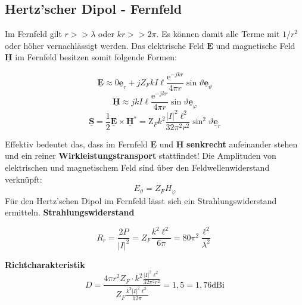 \documentclass[english]{latex4ei/latex4ei_sheet}
\renewcommand{\vec}[1]{\underline{\boldsymbol{#1}}}
\begin{document}
\begin{sectionbox}
\subsection{Hertz'scher Dipol - Fernfeld}
Im Fernfeld gilt $r >> \lambda$ oder $kr >> 2\pi$. Es können damit alle Terme mit $1/r^2$ oder höher vernachlässigt werden. Das elektrische Feld $\vec{E}$ und magnetische Feld $\vec{H}$ im Fernfeld besitzen somit folgende Formen:
\begin{emphbox}
$$
\vec{E} \approx 0 \vec{e}_{r}+j Z_{F} k I \ell \frac{\mathrm{e}^{-j k r}}{4 \pi r} \sin \vartheta \vec{e}_{\vartheta}
$$
$$
\vec{H} \approx j k I \ell \frac{\mathrm{e}^{-j k r}}{4 \pi r} \sin \vartheta \vec{e}_{\varphi}
$$
$$
\vec{S}=\frac{1}{2} \vec{E} \times \vec{H}^{*}=\mathrm{Z}_{F} k^{2} \frac{|I|^{2} \ell^{2}}{32 \pi^{2} r^{2}} \sin ^{2} \vartheta \vec{e}_{r}
$$
\end{emphbox}
Effektiv bedeutet das, dass im Fernfeld $\vec{E}$ und $\vec{H}$ \textbf{senkrecht} aufeinander stehen und ein reiner \textbf{Wirkleistungstransport} stattfindet!
Die Amplituden von elektrischen und magnetischem Feld sind über den Feldwellenwiderstand verknüpft:
$$
E_{\vartheta}=Z_{F} H_{\varphi}
$$
Für den Hertz'schen Dipol im Fernfeld lässt sich ein Strahlungswiderstand ermitteln.
\textbf{Strahlungswiderstand}
\begin{emphbox}
	$$
	R_{r}=\frac{2 P}{|I|^{2}}=Z_{F} \frac{k^{2} \ell^{2}}{6 \pi}=80 \pi^{2} \frac{\ell^{2}}{\lambda^{2}}
	$$
\end{emphbox}
\textbf{Richtcharakteristik}
$$
D=\frac{4 \pi r^{2} Z_{F} \cdot k^{2} \frac{|I|^{2} \ell^{2}}{32 \pi^{2} r^{2}}}{Z_{F} \frac{k^{2}|I|^{2} \ell^{2}}{12 \pi}}=1,5=1,76 \mathrm{dBi}
$$
\end{sectionbox}
\end{document}
